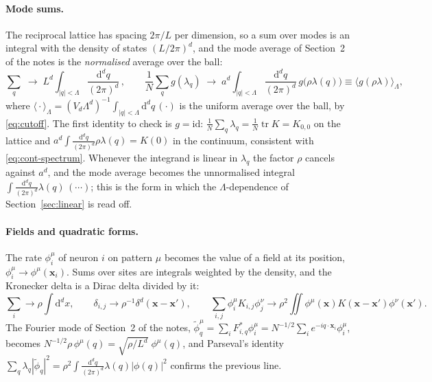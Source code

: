 \documentclass[11pt,a4paper]{article}
\newcommand{\dd}{\mathrm d}
\newcommand{\Lam}{\Lambda}
\newcommand{\ball}[1]{\int_{|q|<\Lam}\frac{\dd^d q}{(2\pi)^d}\,#1}
\newcommand{\avg}[1]{\big\langle #1 \big\rangle_{\Lam}}
\begin{document}
\paragraph{Mode sums.}
The reciprocal lattice has spacing $2\pi/L$ per dimension, so a sum over modes is an integral with the density of states $(L/2\pi)^d$, and the mode average of Section~2 of the notes is the \emph{normalised} average over the ball:
\begin{equation}
  \sum_q \;\to\; L^d\ball{},
  \qquad
  \frac1N\sum_q g(\lambda_q) \;\to\; a^d\ball{g\big(\rho\lambda(q)\big)}
  \equiv \avg{g(\rho\lambda)} ,
  \label{eq:mode-average}
\end{equation}
where $\avg{\cdot} = (V_d\Lam^d)^{-1}\int_{|q|<\Lam}\dd^dq\,(\cdot)$ is the uniform average over the ball, by \eqref{eq:cutoff}.
The first identity to check is $g = \mathrm{id}$: $\frac1N\sum_q\lambda_q = \frac1N\operatorname{tr}K = K_{0,0}$ on the lattice and $a^d\int\frac{\dd^dq}{(2\pi)^d}\rho\lambda(q) = K(0)$ in the continuum, consistent with \eqref{eq:cont-spectrum}. Whenever the integrand is linear in $\lambda_q$ the factor $\rho$ cancels against $a^d$, and the mode average becomes the unnormalised integral $\int\frac{\dd^dq}{(2\pi)^d}\lambda(q)\,(\cdots)$; this is the form in which the $\Lam$-dependence of Section~\ref{sec:linear} is read off.

\paragraph{Fields and quadratic forms.}
The rate $\phi^{\mu}_i$ of neuron $i$ on pattern $\mu$ becomes the value of a field at its position, $\phi^{\mu}_i\to\phi^{\mu}(\mathbf x_i)$. Sums over sites are integrals weighted by the density, and the Kronecker delta is a Dirac delta divided by it:
\begin{equation}
  \sum_i\to\rho\int\dd^dx,
  \qquad
  \delta_{i,j}\to\rho^{-1}\delta^d(\mathbf x-\mathbf x'),
  \qquad
  \sum_{i,j}\phi^{\mu}_iK_{i,j}\phi^{\nu}_j \to \rho^2\iint\phi^{\mu}(\mathbf x)K(\mathbf x-\mathbf x')\phi^{\nu}(\mathbf x').
\end{equation}
The Fourier mode of Section~2 of the notes, $\tilde\phi^{\mu}_q = \sum_iF^*_{i,q}\phi^{\mu}_i = N^{-1/2}\sum_ie^{-iq\cdot\mathbf x_i}\phi^{\mu}_i$, becomes $N^{-1/2}\rho\,\phi^{\mu}(q) = \sqrt{\rho/L^d}\;\phi^{\mu}(q)$, and Parseval's identity $\sum_q\lambda_q|\tilde\phi_q|^2 = \rho^2\int\frac{\dd^dq}{(2\pi)^d}\lambda(q)|\phi(q)|^2$ confirms the previous line.
\end{document}
